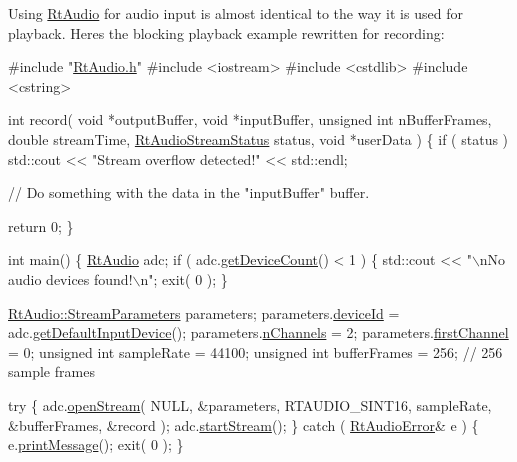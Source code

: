 Using \hyperlink{class_rt_audio}{Rt\+Audio} for audio input is almost identical to the way it is used for playback. Here\textquotesingle{}s the blocking playback example rewritten for recording\+:


\begin{DoxyCode}
\textcolor{preprocessor}{#include "\hyperlink{_rt_audio_8h}{RtAudio.h}"}
\textcolor{preprocessor}{#include <iostream>}
\textcolor{preprocessor}{#include <cstdlib>}
\textcolor{preprocessor}{#include <cstring>}

\textcolor{keywordtype}{int} record( \textcolor{keywordtype}{void} *outputBuffer, \textcolor{keywordtype}{void} *inputBuffer, \textcolor{keywordtype}{unsigned} \textcolor{keywordtype}{int} nBufferFrames,
         \textcolor{keywordtype}{double} streamTime, \hyperlink{_rt_audio_8h_a80e306d363583da3b0a1b65d9b57c806}{RtAudioStreamStatus} status, \textcolor{keywordtype}{void} *userData )
\{
  \textcolor{keywordflow}{if} ( status )
    std::cout << \textcolor{stringliteral}{"Stream overflow detected!"} << std::endl;

  \textcolor{comment}{// Do something with the data in the "inputBuffer" buffer.}

  \textcolor{keywordflow}{return} 0;
\}

\textcolor{keywordtype}{int} main()
\{
  \hyperlink{class_rt_audio}{RtAudio} adc;
  \textcolor{keywordflow}{if} ( adc.\hyperlink{class_rt_audio_a747ce2d73803641bbb66d6e78092aa1a}{getDeviceCount}() < 1 ) \{
    std::cout << \textcolor{stringliteral}{"\(\backslash\)nNo audio devices found!\(\backslash\)n"};
    exit( 0 );
  \}

  \hyperlink{struct_rt_audio_1_1_stream_parameters}{RtAudio::StreamParameters} parameters;
  parameters.\hyperlink{struct_rt_audio_1_1_stream_parameters_ab3c72bcf3ef12149ae9a4fb597cc5489}{deviceId} = adc.\hyperlink{class_rt_audio_aad8b94edd3cd379ee300b125750ac6ce}{getDefaultInputDevice}();
  parameters.\hyperlink{struct_rt_audio_1_1_stream_parameters_a88a10091b6e284e21235cc6f25332ebd}{nChannels} = 2;
  parameters.\hyperlink{struct_rt_audio_1_1_stream_parameters_ad4b4503782653ec93c83328c46abe50c}{firstChannel} = 0;
  \textcolor{keywordtype}{unsigned} \textcolor{keywordtype}{int} sampleRate = 44100;
  \textcolor{keywordtype}{unsigned} \textcolor{keywordtype}{int} bufferFrames = 256; \textcolor{comment}{// 256 sample frames}

  \textcolor{keywordflow}{try} \{
    adc.\hyperlink{class_rt_audio_a6907539d2527775df778ebce32ef1e3b}{openStream}( NULL, &parameters, RTAUDIO\_SINT16,
                    sampleRate, &bufferFrames, &record );
    adc.\hyperlink{class_rt_audio_aec017a89629ccef66a90b60be22a2f80}{startStream}();
  \}
  \textcolor{keywordflow}{catch} ( \hyperlink{class_rt_audio_error}{RtAudioError}& e ) \{
    e.\hyperlink{class_rt_audio_error_a0124bb90075cf3201865a0ea9b43a826}{printMessage}();
    exit( 0 );
  \}
  

\end{DoxyCode}
